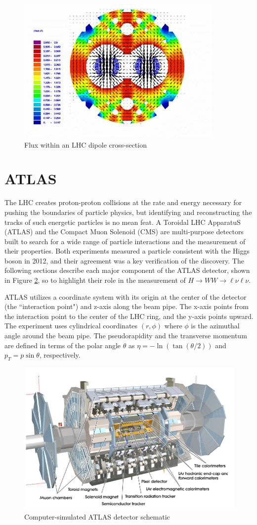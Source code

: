 \begin{figure}[!h]
        \centering
    \includegraphics[width=.6\textwidth]{Pictures/dipolemagnet.jpg}
    \caption{ Flux within an LHC dipole cross-section \cite{LHCref}}
    \label{fig:dipolemagnet}
\end{figure}

\section{ATLAS}
The LHC creates proton-proton collisions at the rate and energy necessary for pushing the boundaries of particle physics, but identifying and reconstructing the tracks of such energetic particles is no mean feat. A Toroidal LHC ApparatuS (ATLAS) and the Compact Muon Solenoid (CMS) are multi-purpose detectors built to search for a wide range of particle interactions and the measurement of their properties. Both experiments measured a particle consistent with the Higgs boson in 2012, and their agreement was a key verification of the discovery. The following sections describe each major component of the ATLAS detector, shown in Figure \ref{fig:ATLASdet}, so to highlight their role in the measurement of $H\rightarrow WW \rightarrow \ell\nu\ell\nu$. 

ATLAS utilizes a coordinate system with its origin at the center of the detector (the ``interaction point") and z-axis along the beam pipe. The x-axis points from the interaction point to the center of the LHC ring, and the y-axis points upward. The experiment uses cylindrical coordinates $(r, \phi)$ where $\phi$ is the azimuthal angle around the beam pipe. The pseudorapidity and the transverse momentum are defined in terms of the polar angle $\theta$ as $\eta = -\ln( \tan(\theta/2))$ and $p_T = p\sin\theta$, respectively. 
\begin{figure}[!h]
    \centering
    \includegraphics[width=.7\textwidth]{Pictures/ATLASdetector.PNG}
    \caption{Computer-simulated ATLAS detector schematic \cite{detector}}
    \label{fig:ATLASdet}
\end{figure}

